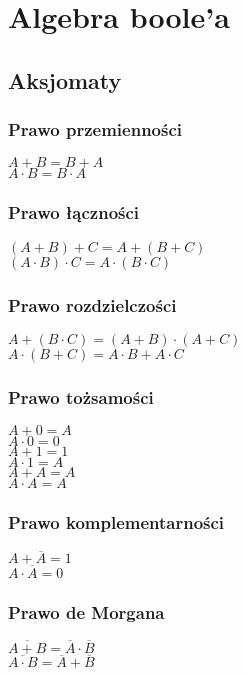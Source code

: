 \section{Algebra boole'a}

\subsection{Aksjomaty}

\subsubsection{Prawo przemienności}
$A+B=B+A$\\[4px]
$A\cdot B=B\cdot A$

\vspace{10px}

\subsubsection{Prawo łączności}
$(A+B)+C=A+(B+C)$\\[4px]
$(A\cdot B)\cdot C=A\cdot (B\cdot C)$

\vspace{10px}

\subsubsection{Prawo rozdzielczości}
$A+(B\cdot C)=(A+B)\cdot (A+C)$\\[4px]
$A\cdot (B+C)=A\cdot B+A\cdot C$


\subsubsection{Prawo tożsamości}

$A+0=A$\\[4px]
$A\cdot0=0$\\[4px]
$A+1=1$\\[4px]
$A\cdot1=A$\\[4px]
$A+A=A$\\[4px]
$A\cdot A=A$

\subsubsection{Prawo komplementarności}

$A+\overline{A}=1$\\[4px]
$A\cdot\overline{A}=0$

\subsubsection{Prawo de Morgana}
$\overline{A+B}=\overline{A}\cdot\overline{B}$\\[5px]
$\overline{A\cdot B}=\overline{A}+\overline{B}$

